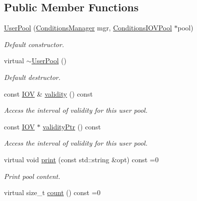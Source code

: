 \subsection*{Public Member Functions}
\begin{DoxyCompactItemize}
\item 
\hyperlink{class_d_d4hep_1_1_conditions_1_1_user_pool_a70dd3921967ca613fe912e90b3139494}{User\+Pool} (\hyperlink{class_d_d4hep_1_1_conditions_1_1_conditions_manager}{Conditions\+Manager} mgr, \hyperlink{class_d_d4hep_1_1_conditions_1_1_conditions_i_o_v_pool}{Conditions\+I\+O\+V\+Pool} $\ast$pool)
\begin{DoxyCompactList}\small\item\em Default constructor. \end{DoxyCompactList}\item 
virtual \hyperlink{class_d_d4hep_1_1_conditions_1_1_user_pool_abc62b1465b8e6f40a57c5a2f9819d7eb}{$\sim$\+User\+Pool} ()
\begin{DoxyCompactList}\small\item\em Default destructor. \end{DoxyCompactList}\item 
const \hyperlink{class_d_d4hep_1_1_i_o_v}{I\+OV} \& \hyperlink{class_d_d4hep_1_1_conditions_1_1_user_pool_ab434e53fd487793e21f376d7b7bac52c}{validity} () const
\begin{DoxyCompactList}\small\item\em Access the interval of validity for this user pool. \end{DoxyCompactList}\item 
const \hyperlink{class_d_d4hep_1_1_i_o_v}{I\+OV} $\ast$ \hyperlink{class_d_d4hep_1_1_conditions_1_1_user_pool_abc7c3d3ff45771e4e20d5d8697b18020}{validity\+Ptr} () const
\begin{DoxyCompactList}\small\item\em Access the interval of validity for this user pool. \end{DoxyCompactList}\item 
virtual void \hyperlink{class_d_d4hep_1_1_conditions_1_1_user_pool_ab0496fbbd4a84368595d3bbd80c475e3}{print} (const std\+::string \&opt) const =0
\begin{DoxyCompactList}\small\item\em Print pool content. \end{DoxyCompactList}\item 
virtual size\+\_\+t \hyperlink{class_d_d4hep_1_1_conditions_1_1_user_pool_ac5f4c186c5037f379e3c12e2daa21a5e}{count} () const =0

\end{DoxyCompactItemize}
